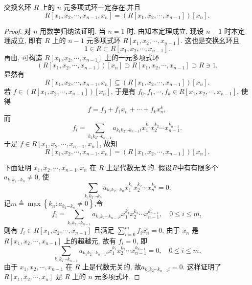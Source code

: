 \documentclass[../../main.tex]{subfiles}%
\begin{document}
\begin{theorem}\label{theorem:任意n元多项式环都可由n-1元的生成}
交换幺环 \( R \) 上的 \( n \) 元多项式环一定存在.并且
\[
R[x_1, x_2, \cdots, x_{n-1}, x_n] = (R[x_1, x_2, \cdots, x_{n-1}])[x_n].
\]
\end{theorem}
\begin{proof}

对 \( n \) 用数学归纳法证明.
当 \( n = 1 \) 时, 由知本定理成立.
现设 \( n-1 \) 时本定理成立, 即有 \( R \) 上的 \( n-1 \) 元多项式环 \( R[x_1, x_2, \cdots, x_{n-1}] \). 这也是交换幺环且
\[
1 \in R \subset R[x_1, x_2, \cdots, x_{n-1}].
\]
再由, 可构造 \( R[x_1, x_2, \cdots, x_{n-1}] \) 上的一元多项式环
\[
(R[x_1, x_2, \cdots, x_{n-1}])[x_n] \supset R[x_1, x_2, \cdots, x_{n-1}] \supset R \ni 1.
\]
显然有
\[
R[x_1, x_2, \cdots, x_{n-1}, x_n] \subseteq (R[x_1, x_2, \cdots, x_{n-1}])[x_n].
\]
若 \( f \in (R[x_1, x_2, \cdots, x_{n-1}])[x_n] \), 于是有 \( f_0, f_1, \cdots, f_k \in R[x_1, x_2, \cdots, x_{n-1}] \), 使得
\[
f = f_0 + f_1 x_n + \cdots + f_k x_n^k,
\]
而
\[
f_i = \sum_{k_1 k_2 \cdots k_{n-1}} a_{k_1 k_2 \cdots k_{n-1} i} x_1^{k_1} x_2^{k_2} \cdots x_{n-1}^{k_{n-1}}.
\]
于是 \( f \in R[x_1, x_2, \cdots, x_{n-1}, x_n] \), 故知
\[
R[x_1, x_2, \cdots, x_{n-1}, x_n] = (R[x_1, x_2, \cdots, x_{n-1}])[x_n].
\]

下面证明 \( x_1, x_2, \cdots, x_{n-1}, x_n \) 在 \( R \) 上是代数无关的. 假设$R$中有有限多个 \( a_{k_1 k_2 \cdots k_n} \ne 0 \), 使
\[
\sum_{k_1 k_2 \cdots k_n} a_{k_1 k_2 \cdots k_n} x_1^{k_1} x_2^{k_2} \cdots x_n^{k_n} = 0.
\]
记$m\triangleq \max \left\{ k_n:a_{k_1\cdots k_n}\ne 0 \right\}$,令
\[
f_i = \sum_{k_1 k_2 \cdots k_{n-1}} a_{k_1 k_2 \cdots k_{n-1} i} x_1^{k_1} x_2^{k_2} \cdots x_{n-1}^{k_{n-1}}, \quad 0 \leqslant i \leqslant m,
\]
则有 \( f_i \in R[x_1, x_2, \cdots, x_{n-1}] \) 且满足 \( \sum_{i=0}^m{f_ix_{n}^{i}}=0 \). 由于 \( x_n \) 是 \( R[x_1, x_2, \cdots, x_{n-1}] \) 上的超越元, 故有 \( f_i = 0 \), 即
\[
\sum_{k_1 k_2 \cdots k_{n-1}} a_{k_1 k_2 \cdots k_{n-1} i} x_1^{k_1} x_2^{k_2} \cdots x_{n-1}^{k_{n-1}} = 0, \quad 0 \leqslant i \leqslant m.
\]
由于 \( x_1, x_2, \cdots, x_{n-1} \) 在 \( R \) 上是代数无关的, 故$a_{k_1 k_2 \cdots k_{n-1} i} = 0.$
这样证明了 \( R[x_1, x_2, \cdots, x_n] \) 是 \( R \) 上的 \( n \) 元多项式环.

\end{proof}
\end{document}
